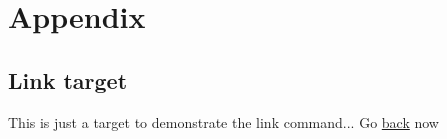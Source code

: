 \section{Appendix}


\hypertarget{link2}{}
\subsection{Link target}
This is just a target to demonstrate the link command...
Go \hyperlink{link1}{back} now
